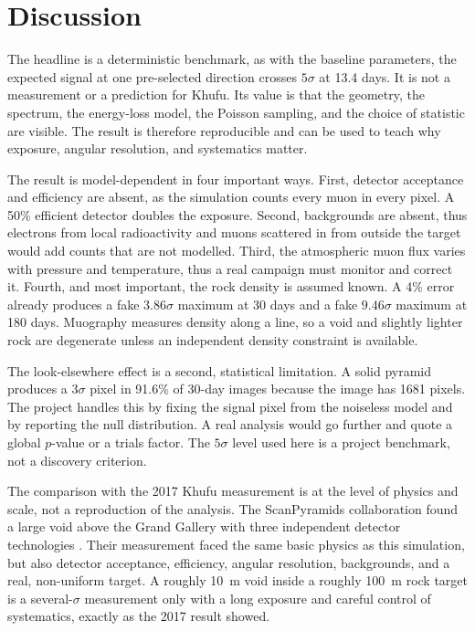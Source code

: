 \documentclass{article}
\begin{document}
\section{Discussion}
\label{sec:discussion}

The headline is a deterministic benchmark, as with the baseline parameters, the
expected signal at one pre-selected direction crosses $5\sigma$ at 13.4 days.
It is not a measurement or a prediction for Khufu. Its value is that the geometry, the spectrum, the energy-loss model,
the Poisson sampling, and the choice of statistic are visible. The result is therefore
reproducible and can be used to teach why exposure, angular resolution, and
systematics matter.

The result is model-dependent in four important ways. First, detector
acceptance and efficiency are absent, as the simulation counts every muon in every
pixel. A 50\% efficient detector doubles the exposure. Second, backgrounds are
absent, thus electrons from local radioactivity and muons scattered in from outside
the target would add counts that are not modelled. Third, the atmospheric muon
flux varies with pressure and temperature, thus a real campaign must monitor and
correct it. Fourth, and most important, the rock density is assumed known. A
4\% error already produces a fake $3.86\sigma$ maximum at 30 days and a fake
$9.46\sigma$ maximum at 180 days. Muography measures density along a line, so a
void and slightly lighter rock are degenerate unless an independent density
constraint is available.

The look-elsewhere effect is a second, statistical limitation. A solid pyramid
produces a $3\sigma$ pixel in 91.6\% of 30-day images because the image has
1681 pixels. The project handles this by fixing the signal pixel from the
noiseless model and by reporting the null distribution. A real analysis would
go further and quote a global $p$-value or a trials factor. The $5\sigma$ level
used here is a project benchmark, not a discovery criterion.

The comparison with the 2017 Khufu measurement is at the level of physics and
scale, not a reproduction of the analysis. The ScanPyramids collaboration found
a large void above the Grand Gallery with three independent detector
technologies \cite{morishima2017}. Their measurement faced the same basic
physics as this simulation, but also detector acceptance, efficiency, angular
resolution, backgrounds, and a real, non-uniform target. A roughly 10~m void
inside a roughly 100~m rock target is a several-$\sigma$ measurement only with
a long exposure and careful control of systematics, exactly as the 2017 result
showed.
\end{document}

